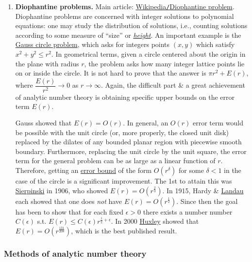 \documentclass{article}
\begin{document}
\begin{enumerate}
	\item {\bf Diophantine problems.} Main article: \href{https://en.wikipedia.org/wiki/Diophantine_problem}{Wikipedia{\tt/}Diophantine problem}. Diophantine problems are concerned with integer solutions to polynomial equations: one may study the distribution of solutions, i.e., counting solutions according to some measure of ``size'' or \href{https://en.wikipedia.org/wiki/Height_function}{\it height}. An important example is the \href{https://en.wikipedia.org/wiki/Gauss_circle_problem}{Gauss circle problem}, which asks for integers points $(x,y)$ which satisfy $x^2 + y^2\le r^2$. In geometrical terms, given a circle centered about the origin in the plane with radius $r$, the problem asks how many integer lattice points lie on or inside the circle. It is not hard to prove that the answer is $\pi r^2 + E(r)$, where $\dfrac{E(r)}{r^2}\to0$ as $r\to\infty$. Again, the difficult part \& a great achievement of analytic number theory is obtaining specific upper bounds on the error term $E(r)$.
	
	{\sf Gauss} showed that $E(r) = O(r)$. In general, an $O(r)$ error term would be possible with the unit circle (or, more properly, the closed unit disk) replaced by the dilates of any bounded planar region with piecewise smooth boundary. Furthermore, replacing the unit circle by the unit square, the error term for the general problem can be as large as a linear function of $r$. Therefore, getting an \href{https://en.wikipedia.org/wiki/Error_bound}{error bound} of the form $O(r^\delta)$ for some $\delta < 1$ in the case of the circle is a significant improvement. The 1st to attain this was \href{https://en.wikipedia.org/wiki/Wac%C5%82aw_Sierpi%C5%84ski}{\sc Sierpinski} in 1906, who showed $E(r) = O(r^{\frac{2}{3}})$. In 1915, {\sc Hardy \& \href{https://en.wikipedia.org/wiki/Edmund_Landau}{Landau}} each showed that one does {\it not} have $E(r) = O(r^{\frac{1}{2}})$. Since then the goal has been to show that for each fixed $\epsilon > 0$ there exists a number number $C(\epsilon)$ s.t. $E(r)\le C(\epsilon)r^{\frac{1}{2} + \epsilon}$. In 2000 \href{https://en.wikipedia.org/wiki/Martin_Huxley}{\sc Huxley} showed that $E(r) = O(r^{\frac{131}{208}})$, which is the best published result.
\end{enumerate}

\subsubsection{Methods of analytic number theory}
\end{document}
